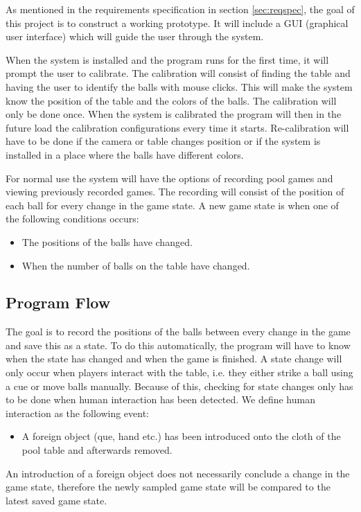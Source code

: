 As mentioned in the requirements specification in section \ref{sec:reqspec}, the goal of this project is to construct a working prototype. It will include a GUI (graphical user interface) which will guide the user through the system.

When the system is installed and the program runs for the first time, it will prompt the user to calibrate. The calibration will consist of finding the table and having the user to identify the balls with mouse clicks. This will make the system know the position of the table and the colors of the balls. The calibration will only be done once. When the system is calibrated the program will then in the future load the calibration configurations every time it starts. Re-calibration will have to be done if the camera or table changes position or if the system is installed in a place where the balls have different colors.

For normal use the system will have the options of recording pool games and viewing previously recorded games. The recording will consist of the position of each ball for every change in the game state. A new game state is when one of the following conditions occurs: 
\begin{itemize}
	\item The positions of the balls have changed.
	\item When the number of balls on the table have changed.
\end{itemize}

\subsection{Program Flow}
The goal is to record the positions of the balls between every change in the game and save this as a state. To do this automatically, the program will have to know when the state has changed and when the game is finished. A state change will only occur when players interact with the table, i.e. they either strike a ball using a cue or move balls manually. Because of this, checking for state changes only has to be done when human interaction has been detected. We define human interaction as the following event:
\begin{itemize}
	\item  A foreign object (que, hand etc.) has been introduced onto the cloth of the pool table and afterwards removed.
\end{itemize}

An introduction of a foreign object does not necessarily conclude a change in the game state, therefore the newly sampled game state will be compared to the latest saved game state.

